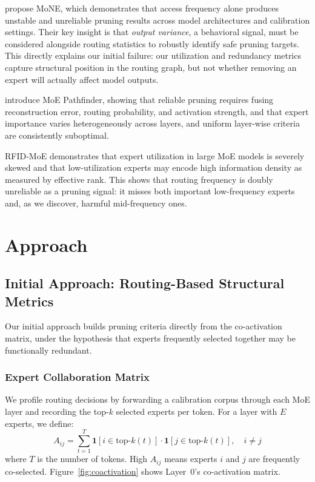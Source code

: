 \documentclass{article}
\begin{document}
\citet{zhang2025mone} propose MoNE, which demonstrates that access frequency alone produces unstable and unreliable pruning results across model architectures and calibration settings. Their key insight is that \emph{output variance}, a behavioral signal, must be considered alongside routing statistics to robustly identify safe pruning targets. This directly explains our initial failure: our utilization and redundancy metrics capture structural position in the routing graph, but not whether removing an expert will actually affect model outputs.

\citet{yang2025pathfinder} introduce MoE Pathfinder, showing that reliable pruning requires fusing reconstruction error, routing probability, and activation strength, and that expert importance varies heterogeneously across layers, and uniform layer-wise criteria are consistently suboptimal.

RFID-MoE \citep{mi2026rfidmoe} demonstrates that expert utilization in large MoE models is severely skewed and that low-utilization experts may encode high information density as measured by effective rank. This shows that routing frequency is doubly unreliable as a pruning signal: it misses both important low-frequency experts and, as we discover, harmful mid-frequency ones.

\section{Approach}

\subsection{Initial Approach: Routing-Based Structural Metrics}

Our initial approach builds pruning criteria directly from the co-activation matrix, under the hypothesis that experts frequently selected together may be functionally redundant.

\subsubsection{Expert Collaboration Matrix}

We profile routing decisions by forwarding a calibration corpus through each MoE layer and recording the top-$k$ selected experts per token. For a layer with $E$ experts, we define:
\begin{equation}
A_{ij} = \sum_{t=1}^{T} \mathbf{1}[i \in \text{top-}k(t)] \cdot \mathbf{1}[j \in \text{top-}k(t)], \quad i \neq j
\label{eq:collab}
\end{equation}
where $T$ is the number of tokens. High $A_{ij}$ means experts $i$ and $j$ are frequently co-selected. Figure~\ref{fig:coactivation} shows Layer~0's co-activation matrix.
\end{document}
